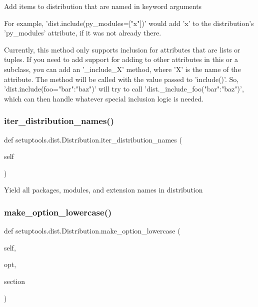 \begin{DoxyVerb}Add items to distribution that are named in keyword arguments

For example, 'dist.include(py_modules=["x"])' would add 'x' to
the distribution's 'py_modules' attribute, if it was not already
there.

Currently, this method only supports inclusion for attributes that are
lists or tuples.  If you need to add support for adding to other
attributes in this or a subclass, you can add an '_include_X' method,
where 'X' is the name of the attribute.  The method will be called with
the value passed to 'include()'.  So, 'dist.include(foo={"bar":"baz"})'
will try to call 'dist._include_foo({"bar":"baz"})', which can then
handle whatever special inclusion logic is needed.
\end{DoxyVerb}
 \mbox{\label{classsetuptools_1_1dist_1_1Distribution_a598f1821d0e4868b2f1863eae1c2c945}} 
\subsubsection{\texorpdfstring{iter\+\_\+distribution\+\_\+names()}{iter\_distribution\_names()}}
{\footnotesize\ttfamily def setuptools.\+dist.\+Distribution.\+iter\+\_\+distribution\+\_\+names (\begin{DoxyParamCaption}\item[{}]{self }\end{DoxyParamCaption})}

\begin{DoxyVerb}Yield all packages, modules, and extension names in distribution\end{DoxyVerb}
 \mbox{\label{classsetuptools_1_1dist_1_1Distribution_a21dad0a70f42d8ba4ae435d226d97c67}} 
\subsubsection{\texorpdfstring{make\+\_\+option\+\_\+lowercase()}{make\_option\_lowercase()}}
{\footnotesize\ttfamily def setuptools.\+dist.\+Distribution.\+make\+\_\+option\+\_\+lowercase (\begin{DoxyParamCaption}\item[{}]{self,  }\item[{}]{opt,  }\item[{}]{section }\end{DoxyParamCaption})}


